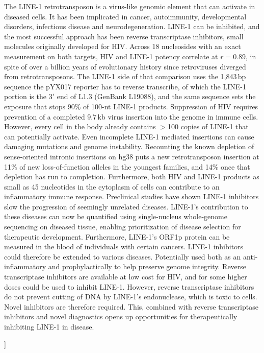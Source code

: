 \documentclass[11pt,twocolumn,twoside]{extarticle}
\begin{document}
{\begin{minipage}{\dimexpr\textwidth-2\fboxsep-2\fboxrule\relax}
The LINE-1 retrotransposon is a virus-like genomic element that can activate in diseased cells. It has been implicated in cancer, autoimmunity, developmental disorders, infectious disease and neurodegeneration. LINE-1 can be inhibited, and the most successful approach has been reverse transcriptase inhibitors, small molecules originally developed for HIV. Across 18 nucleosides with an exact measurement on both targets, HIV and LINE-1 potency correlate at $r = 0.89$, in spite of over a billion years of evolutionary history since retroviruses diverged from retrotransposons. The LINE-1 side of that comparison uses the 1,843\,bp sequence the pYX017 reporter has to reverse transcribe, of which the LINE-1 portion is the 3$'$ end of L1.3 (GenBank L19088), and the same sequence sets the exposure that stops 90\% of 100-nt LINE-1 products. Suppression of HIV requires prevention of a completed 9.7\,kb virus insertion into the genome in immune cells. However, every cell in the body already contains $>$100 copies of LINE-1 that can potentially activate. Even incomplete LINE-1 mediated insertions can cause damaging mutations and genome instability. Recounting the known depletion of sense-oriented intronic insertions on hg38 puts a new retrotransposon insertion at 11\% of new loss-of-function alleles in the youngest families, and 14\% once that depletion has run to completion. Furthermore, both HIV and LINE-1 products as small as 45 nucleotides in the cytoplasm of cells can contribute to an inflammatory immune response. Preclinical studies have shown LINE-1 inhibitors slow the progression of seemingly unrelated diseases. LINE-1's contribution to these diseases can now be quantified using single-nucleus whole-genome sequencing on diseased tissue, enabling prioritization of disease selection for therapeutic development. Furthermore, LINE-1's ORF1p protein can be measured in the blood of individuals with certain cancers. LINE-1 inhibitors could therefore be extended to various diseases. Potentially used both as an anti-inflammatory and prophylactically to help preserve genome integrity. Reverse transcriptase inhibitors are available at low cost for HIV, and for some higher doses could be used to inhibit LINE-1. However, reverse transcriptase inhibitors do not prevent cutting of DNA by LINE-1's endonuclease, which is toxic to cells. Novel inhibitors are therefore required. This, combined with reverse transcriptase inhibitors and novel diagnostics opens up opportunities for therapeutically inhibiting LINE-1 in disease.
\end{minipage}}
\vspace{1.05em}
]
\end{document}
